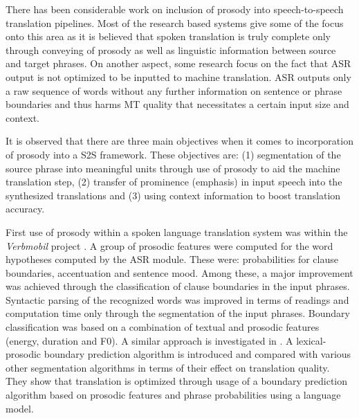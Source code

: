 
There has been considerable work on inclusion of prosody into speech-to-speech translation pipelines. Most of the research based systems give some of the focus onto this area as it is believed that spoken translation is truly complete only through conveying of prosody as well as linguistic information between source and target phrases. On another aspect, some research focus on the fact that ASR output is not optimized to be inputted to machine translation. ASR outputs only a raw sequence of words without any further information on sentence or phrase boundaries and thus harms MT quality that necessitates a certain input size and context. 

It is observed that there are three main objectives when it comes to incorporation of prosody into a S2S framework. These objectives are: (1) segmentation of the source phrase into meaningful units through use of prosody to aid the machine translation step, (2) transfer of prominence (emphasis) in input speech into the synthesized translations and (3) using context information to boost translation accuracy. 

First use of prosody within a spoken language translation system was within the \textit{Verbmobil} project \citep{verbmobil_prosody}. A group of prosodic features were computed for the word hypotheses computed by the ASR module. These were: probabilities for clause boundaries, accentuation and sentence mood. Among these, a major improvement was achieved through the classification of clause boundaries in the input phrases. Syntactic parsing of the recognized words was improved in terms of readings and computation time only through the segmentation of the input phrases. Boundary classification was based on a combination of textual and prosodic features (energy, duration and F0). A similar approach is investigated in \cite{Matusov07improvingspeech}. A lexical-prosodic boundary prediction algorithm is introduced and compared with various other segmentation algorithms in terms of their effect on translation quality. They show that translation is optimized through usage of a boundary prediction algorithm based on prosodic features and phrase probabilities using a language model. 

